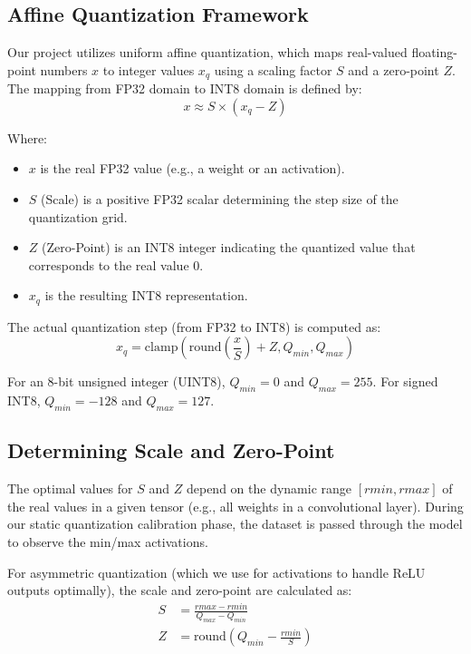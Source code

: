 \subsection{Affine Quantization Framework}
Our project utilizes uniform affine quantization, which maps real-valued floating-point numbers $x$ to integer values $x_q$ using a scaling factor $S$ and a zero-point $Z$. The mapping from FP32 domain to INT8 domain is defined by:
\begin{equation} \label{eq:quant}
    x \approx S \times (x_q - Z)
\end{equation}

Where:
\begin{itemize}
    \item $x$ is the real FP32 value (e.g., a weight or an activation).
    \item $S$ (Scale) is a positive FP32 scalar determining the step size of the quantization grid.
    \item $Z$ (Zero-Point) is an INT8 integer indicating the quantized value that corresponds to the real value 0.
    \item $x_q$ is the resulting INT8 representation.
\end{itemize}

The actual quantization step (from FP32 to INT8) is computed as:
\begin{equation} \label{eq:quant_forward}
    x_q = \text{clamp}\left( \text{round}\left( \frac{x}{S} \right) + Z, Q_{min}, Q_{max} \right)
\end{equation}

For an 8-bit unsigned integer (UINT8), $Q_{min} = 0$ and $Q_{max} = 255$. For signed INT8, $Q_{min} = -128$ and $Q_{max} = 127$.

\subsection{Determining Scale and Zero-Point}
The optimal values for $S$ and $Z$ depend on the dynamic range $[rmin, rmax]$ of the real values in a given tensor (e.g., all weights in a convolutional layer). During our static quantization calibration phase, the dataset is passed through the model to observe the min/max activations.

For asymmetric quantization (which we use for activations to handle ReLU outputs optimally), the scale and zero-point are calculated as:
\begin{align}
    S &= \frac{rmax - rmin}{Q_{max} - Q_{min}} \\
    Z &= \text{round}\left( Q_{min} - \frac{rmin}{S} \right)
\end{align}

